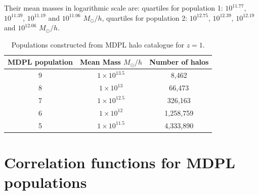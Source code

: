 Their mean masses in logarithmic scale are: quartiles for population 1: 
$10^{11.77}$, $10^{11.39}$, $10^{11.19}$ and $10^{11.06}$ $M_{\odot}/h$, 
quartiles for population 2:
$10^{12.75}$, $10^{12.39}$, $10^{12.19}$ and $10^{12.06}$ $M_{\odot}/h$.


\begin{table}
\begin{center}
  \begin{tabular}{ | c | c | c | }
    \hline \hline
    MDPL population & Mean Mass $M_{\odot}/h$& Number of halos \\ \hline \hline    
    9 & $ 1\times 10^{13.5}$ & 8,462\\ \hline
    8 & $ 1\times 10^{13}$ & 66,473 \\ \hline
    7 & $ 1\times 10^{12.5}$ & 326,163 \\ \hline
    6 & $ 1\times 10^{12}$ & 1,258,759 \\ \hline
    5 & $ 1\times 10^{11.5}$ & 4,333,890 \\ \hline
  \end{tabular}  
   \caption{ Populations constructed from MDPL halo catalogue for $z=1$. }
\label{z1}
\end{center}
\end{table}



\section{ Correlation functions for MDPL populations}



